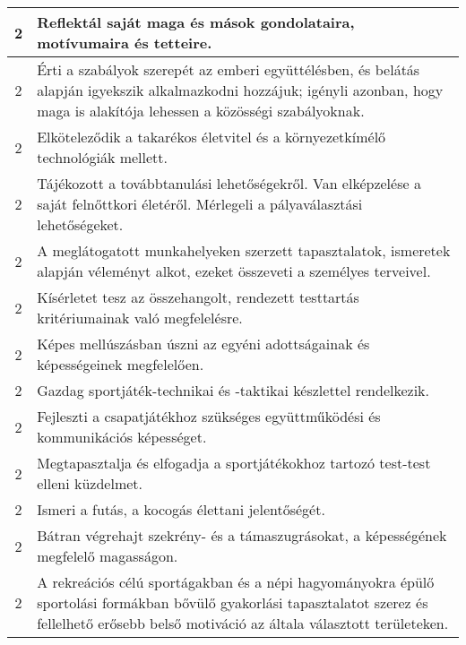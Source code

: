 \begin{longtable}{c | p{12cm} }
                                
                                          2 &  Reflektál saját maga és mások gondolataira, motívumaira és tetteire. \\ \hline
                                          2 &  Érti a szabályok szerepét az emberi együttélésben, és belátás alapján igyekszik alkalmazkodni hozzájuk; igényli azonban, hogy maga is alakítója lehessen a közösségi szabályoknak. \\ \hline
                                          2 &  Elköteleződik a takarékos életvitel és a környezetkímélő technológiák mellett. \\ \hline
                                          2 &  Tájékozott a továbbtanulási lehetőségekről. Van elképzelése a saját felnőttkori életéről. Mérlegeli a pályaválasztási lehetőségeket. \\ \hline
                                          2 &  A meglátogatott munkahelyeken szerzett tapasztalatok, ismeretek alapján véleményt alkot, ezeket összeveti a személyes terveivel. \\ \hline
                                          2 &  Kísérletet tesz az összehangolt, rendezett testtartás kritériumainak való megfelelésre. \\ \hline
                                          2 &  Képes mellúszásban úszni az egyéni adottságainak és képességeinek megfelelően. \\ \hline
                                          2 &  Gazdag sportjáték-technikai és -taktikai készlettel rendelkezik. \\ \hline
                                          2 &  Fejleszti a csapatjátékhoz szükséges együttműködési és kommunikációs képességet. \\ \hline
                                          2 &  Megtapasztalja és elfogadja a sportjátékokhoz tartozó test-test elleni küzdelmet. \\ \hline
                                          2 &  Ismeri a futás, a kocogás élettani jelentőségét. \\ \hline
                                          2 &  Bátran végrehajt szekrény- és a támaszugrásokat, a képességének megfelelő magasságon. \\ \hline
                                          2 &  A rekreációs célú sportágakban és a népi hagyományokra épülő sportolási formákban bővülő gyakorlási tapasztalatot szerez és fellelhető erősebb belső motiváció az általa választott területeken. \\ \hline

\end{longtable}
